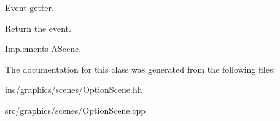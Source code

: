 Event getter. 

Return the event. 

Implements \hyperlink{classAScene_af521e5e6d30a5d2e5d30eb333e4d3abd}{A\+Scene}.



The documentation for this class was generated from the following files\+:\begin{DoxyCompactItemize}
\item 
inc/graphics/scenes/\hyperlink{OptionScene_8hh}{Option\+Scene.\+hh}\item 
src/graphics/scenes/Option\+Scene.\+cpp\end{DoxyCompactItemize}
